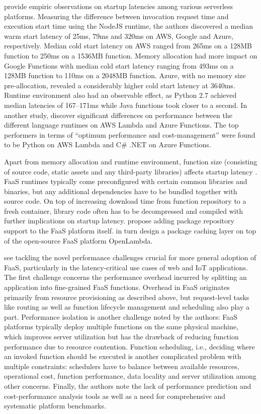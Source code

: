 \textcite{wang18peekingbehindcurtains} provide empiric observations on startup latencies among various serverless platforms. Measuring the difference between invocation request time and execution start time using the NodeJS runtime, the authors discovered a median warm start latency of 25ms, 79ms and 320ms on AWS, Google and Azure, respectively. Median cold start latency on AWS ranged from 265ms on a 128MB function to 250ms on a 1536MB function. Memory allocation had more impact on Google Functions with median cold start latency ranging from 493ms on a 128MB function to 110ms on a 2048MB function. Azure, with no memory size pre-allocation, revealed a considerably higher cold start latency at 3640ms. Runtime environment also had an observable effect, as Python 2.7 achieved median latencies of 167--171ms while Java functions took closer to a second. In another study, \textcite{jackson18languageImpact} discover significant differences on performance between the different language runtimes on AWS Lambda and Azure Functions. The top performers in terms of ``optimum performance and cost-management'' were found to be Python on AWS Lambda and C\# .NET on Azure Functions.

Apart from memory allocation and runtime environment, function size (consisting of source code, static assets and any third-party libraries) affects startup latency \parencite{hendrickson16openlambda}. FaaS runtimes typically come preconfigured with certain common libraries and binaries, but any additional dependencies have to be bundled together with source code. On top of increasing download time from function repository to a fresh container, library code often has to be decompressed and compiled with further implications on startup latency. \textcite{hendrickson16openlambda} propose adding package repository support to the FaaS platform itself. \textcite{oakes17pipsqueak} in turn design a package caching layer on top of the open-source FaaS platform OpenLambda.

\textcite{van18perfchallenges} see tackling the novel performance challenges crucial for more general adoption of FaaS, particularly in the latency-critical use cases of web and IoT applications. The first challenge concerns the performance overhead incurred by splitting an application into fine-grained FaaS functions. Overhead in FaaS originates primarily from resource provisioning as described above, but request-level tasks like routing as well as function lifecycle management and scheduling also play a part. Performance isolation is another challenge noted by the authors: FaaS platforms typically deploy multiple functions on the same physical machine, which improves server utilization but has the drawback of reducing function performance due to resource contention. Function scheduling, i.e., deciding where an invoked function should be executed is another complicated problem with multiple constraints: schedulers have to balance between available resources, operational cost, function performance, data locality and server utilization among other concerns. Finally, the authors note the lack of performance prediction and cost-performance analysis tools as well as a need for comprehensive and systematic platform benchmarks.

